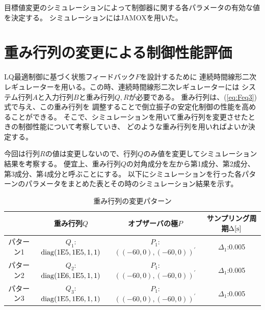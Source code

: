 目標値変更のシミュレーションによって制御器に関する各パラメータの有効な値を決定する。 シミュレーションにはJAMOXを用いた。
\section{重み行列の変更による制御性能評価}
	LQ最適制御に基づく状態フィードバック$F$を設計するために
	連続時間線形二次レギュレーターを用いる。この時、連続時間線形二次レギュレーターには
	システム行列$A$と入力行列$B$と重み行列$Q,R$が必要である。
	重み行列は、(\ref{eq:Feq3})式で与え、この重み行列を
	調整することで倒立振子の安定化制御の性能を高めることができる。
	そこで、シミュレーションを用いて重み行列を変更させたときの制御性能について考察していき、
	どのような重み行列を用いればよいか決定する。
	\par
	今回は行列$R$の値は変更しないので、行列$Q$のみ値を変更してシミュレーション結果を考察する。
	便宜上、重み行列$Q$の対角成分を左から第1成分、第2成分、第3成分、第4成分と呼ぶことにする。
	以下にシミュレーションを行った各パターンのパラメータをまとめた表とその時のシミュレーション結果を示す。
	\begin{table}[htb]
		\begin{center}
			\caption{重み行列の変更パターン}
			\begin{tabular}{|c|c|c|c|}\hline
				& 重み行列$Q$ & オブザーバの極$P$ & サンプリング周期$\Delta[\rm{s}]$ \\ \hline\hline
				パターン1 & $Q_1$:$\rm{diag}(1E5,1E5,1,1)$ & $P_1$:$((-60,0),(-60,0))^{'}$ & $\Delta_1$:0.005 \\ \hline
				パターン2 & $Q_2$:$\rm{diag}(1E6,1E5,1,1)$ & $P_1$:$((-60,0),(-60,0))^{'}$ & $\Delta_1$:0.005 \\ \hline
				パターン3 & $Q_3$:$\rm{diag}(1E5,1E6,1,1)$ & $P_1$:$((-60,0),(-60,0))^{'}$ & $\Delta_1$:0.005 \\ \hline
			\end{tabular}
		\end{center}
		\label{table:QRF}
	\end{table}
	
